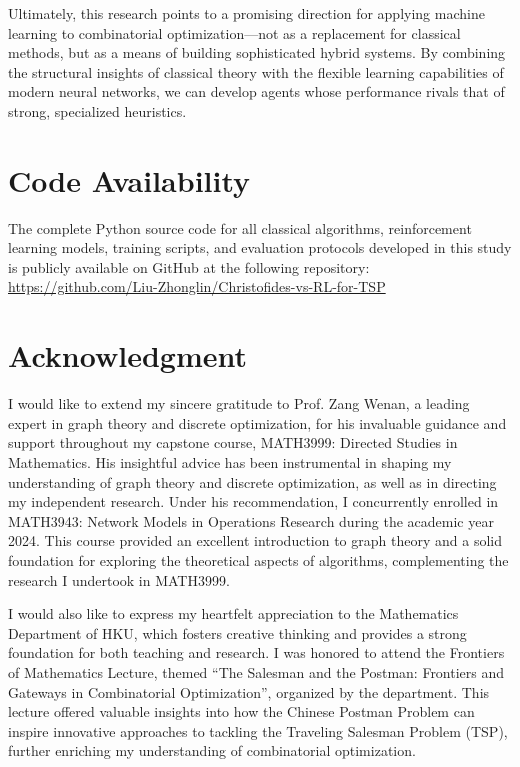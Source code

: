 \documentclass[12pt]{article}
\theoremstyle{remarkstyle}
\begin{document}
Ultimately, this research points to a promising direction for applying machine learning to combinatorial optimization—not as a replacement for classical methods, but as a means of building sophisticated hybrid systems. By combining the structural insights of classical theory with the flexible learning capabilities of modern neural networks, we can develop agents whose performance rivals that of strong, specialized heuristics.
	
	\section*{Code Availability}
	The complete Python source code for all classical algorithms, reinforcement learning models, training scripts, and evaluation protocols developed in this study is publicly available on GitHub at the following repository: \url{https://github.com/Liu-Zhonglin/Christofides-vs-RL-for-TSP}
	
	
	\section*{Acknowledgment}
	
	I would like to extend my sincere gratitude to Prof. Zang Wenan, a leading expert in graph theory and discrete optimization, for his invaluable guidance and support throughout my capstone course, MATH3999: Directed Studies in Mathematics. His insightful advice has been instrumental in shaping my understanding of graph theory and discrete optimization, as well as in directing my independent research. Under his recommendation, I concurrently enrolled in MATH3943: Network Models in Operations Research during the academic year 2024. This course provided an excellent introduction to graph theory and a solid foundation for exploring the theoretical aspects of algorithms, complementing the research I undertook in MATH3999.
	
	I would also like to express my heartfelt appreciation to the Mathematics Department of HKU, which fosters creative thinking and provides a strong foundation for both teaching and research. I was honored to attend the Frontiers of Mathematics Lecture, themed “The Salesman and the Postman: Frontiers and Gateways in Combinatorial Optimization”, organized by the department. This lecture offered valuable insights into how the Chinese Postman Problem can inspire innovative approaches to tackling the Traveling Salesman Problem (TSP), further enriching my understanding of combinatorial optimization.
\end{document}
